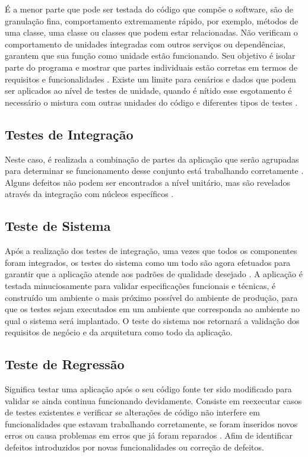 É a menor parte que pode ser testada do código que compõe o software, são de granulação fina, comportamento extremamente rápido, por exemplo, métodos de uma classe, uma classe ou classes que podem estar relacionadas. Não verificam o comportamento de unidades integradas com outros serviços ou dependências, garantem que sua função como unidade estão funcionando. Seu objetivo é isolar parte do programa e mostrar que partes individuais estão corretas em termos de requisitos e funcionalidades \cite{James2012}.  Existe um limite para cenários e dados que podem ser aplicados ao nível de testes de unidade, quando é nítido esse esgotamento é necessário o mistura com outras unidades do código e diferentes tipos de testes \cite{tutorialsPoint}.

\subsection{Testes de Integração}

Neste caso, é realizada a combinação de partes da aplicação que serão agrupadas para determinar se funcionamento desse conjunto está trabalhando corretamente \cite{tutorialsPoint}. Alguns defeitos não podem ser encontrados a nível unitário, mas são revelados através da integração com núcleos específicos \cite{Pachawan2014}.

\subsection{Teste de Sistema}

Após a realização dos testes de integração, uma vezes que todos os componentes foram integrados, os testes do sistema como um todo são agora efetuados para garantir que a aplicação atende aos padrões de qualidade desejado \cite{tutorialsPoint}. A aplicação é testada minuciosamente para validar especificações funcionais e técnicas, é construído um ambiente o mais próximo possível do ambiente de produção, para que os testes sejam executados em um ambiente que corresponda ao ambiente no qual o sistema será implantado. O teste do sistema nos retornará a validação dos requisitos de negócio e da arquitetura como todo da aplicação.

\subsection{Teste de Regressão}

Significa testar uma aplicação após o seu código fonte ter sido modificado para validar se ainda continua funcionando devidamente. Consiste em reexecutar casos de testes existentes e verificar se alterações de código não interfere em funcionalidades que estavam trabalhando corretamente, se foram inseridos novos erros ou causa problemas em erros que já foram reparados \cite{Leung1990}. Afim de identificar defeitos introduzidos por novas funcionalidades ou correção de defeitos.

